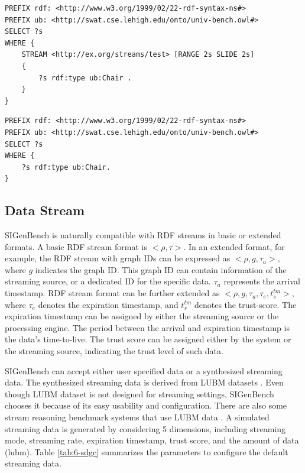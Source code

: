 \begin{lstlisting}[language=SPARQL,caption={CQELS Query Example},basicstyle=\small,frame=single]
PREFIX rdf: <http://www.w3.org/1999/02/22-rdf-syntax-ns#>
PREFIX ub: <http://swat.cse.lehigh.edu/onto/univ-bench.owl#>
SELECT ?s 
WHERE { 
	STREAM <http://ex.org/streams/test> [RANGE 2s SLIDE 2s] 
	{ 
    	?s rdf:type ub:Chair . 
    } 
}
\end{lstlisting}

\begin{lstlisting}[language=SPARQL, caption={Parsed Standard SPARQL Query},basicstyle=\small,frame=single]
PREFIX rdf: <http://www.w3.org/1999/02/22-rdf-syntax-ns#>
PREFIX ub: <http://swat.cse.lehigh.edu/onto/univ-bench.owl#>
SELECT ?s
WHERE {	
	?s rdf:type ub:Chair.
}
\end{lstlisting}
%
\subsection{Data Stream}
SIGenBench is naturally compatible with RDF streams in basic or extended formats.
A basic RDF stream format is $<\rho, \tau>$.
In an extended format, for example, the RDF stream with graph IDs can be expressed as $<\rho, g, \tau_{a}>$, where $g$ indicates the graph ID. 
This graph ID can contain information of the streaming source, or a dedicated ID for the specific data. 
$\tau_{a}$ represents the arrival timestamp. 
RDF stream format can be further extended as $<\rho, g, \tau_{a}, \tau_{e}, t^{tm}_{s}>$, where $\tau_{e}$ denotes the expiration timestamp, and $t^{tm}_{s}$ denotes the trust-score.
The expiration timestamp can be assigned by either the streaming source or the processing engine.
The period between the arrival and expiration timestamp is the data's time-to-live. 
The trust score can be assigned either by the system or the streaming source, indicating the trust level of such data. 

SIGenBench can accept either user specified data or a synthesized streaming data.
The synthesized streaming data is derived from LUBM datasets \cite{guo2005lubm}. 
Even though LUBM dataset is not designed for streaming settings, SIGenBench chooses it because of its easy usability and configuration. 
There are also some stream reasoning benchmark systems that use LUBM data \cite{tommasini2015heaven}.
A simulated streaming data is generated by considering 5 dimensions, including streaming mode, streaming rate, expiration timestamp, trust score, and the amount of data (lubm). 
Table \ref{tab:6-sdgc} summarizes the parameters to configure the default streaming data.

